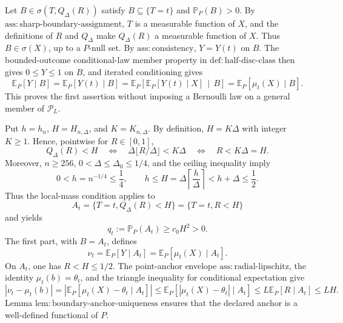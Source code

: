 Let \(B\in\sigma(T,Q_\Delta(R))\) satisfy \(B\subseteq\{T=t\}\) and \(\mathbb P_P(B)>0\).  By \(\mathrm{ass:sharp\text{-}boundary\text{-}assignment}\), \(T\) is a measurable function of \(X\), and the definitions of \(R\) and \(Q_\Delta\) make \(Q_\Delta(R)\) a measurable function of \(X\).  Thus \(B\in\sigma(X)\), up to a \(P\)-null set.  By \(\mathrm{ass:consistency}\), \(Y=Y(t)\) on \(B\).  The bounded-outcome conditional-law member property in \(\mathrm{def:half\text{-}disc\text{-}class}\) then gives \(0\leq Y\leq1\) on \(B\), and iterated conditioning gives
\[
 \mathbb E_P[Y\mid B]
 =\mathbb E_P[Y(t)\mid B]
 =\mathbb E_P\!\left[\mathbb E_P[Y(t)\mid X]\,\middle|\,B\right]
 =\mathbb E_P[\mu_t(X)\mid B].
\]
This proves the first assertion without imposing a Bernoulli law on a general member of \(\mathcal P_L\).

Put \(h=h_n\), \(H=H_{n,\Delta}\), and \(K=K_{n,\Delta}\).  By definition, \(H=K\Delta\) with integer \(K\geq1\).  Hence, pointwise for \(R\in[0,1]\),
\[
 Q_\Delta(R)<H
 \quad\Longleftrightarrow\quad
 \Delta\lfloor R/\Delta\rfloor<K\Delta
 \quad\Longleftrightarrow\quad
 R<K\Delta=H.
\]
Moreover, \(n\geq256\), \(0<\Delta\leq\Delta_0\leq1/4\), and the ceiling inequality imply
\[
 0<h=n^{-1/4}\leq\frac14,
 \qquad
 h\leq H=\Delta\left\lceil\frac h\Delta\right\rceil<h+\Delta\leq\frac12.
\]
Thus the local-mass condition applies to
\[
 A_t=\{T=t,Q_\Delta(R)<H\}=\{T=t,R<H\}
\]
and yields
\[
 q_t:=\mathbb P_P(A_t)\geq c_0H^2>0.
\]
The first part, with \(B=A_t\), defines
\[
 \nu_t=\mathbb E_P[Y\mid A_t]
      =\mathbb E_P[\mu_t(X)\mid A_t].
\]
On \(A_t\), one has \(R<H\leq1/2\).  The point-anchor envelope \(\mathrm{ass:radial\text{-}lipschitz}\), the identity \(\mu_t(b)=\theta_t\), and the triangle inequality for conditional expectation give
\[
 \left|\nu_t-\mu_t(b)\right|
 =\left|\mathbb E_P[\mu_t(X)-\theta_t\mid A_t]\right|
 \leq\mathbb E_P[|\mu_t(X)-\theta_t|\mid A_t]
 \leq L\mathbb E_P[R\mid A_t]
 \leq LH.
\]
Lemma \(\mathrm{lem:boundary\text{-}anchor\text{-}uniqueness}\) ensures that the declared anchor is a well-defined functional of \(P\).

